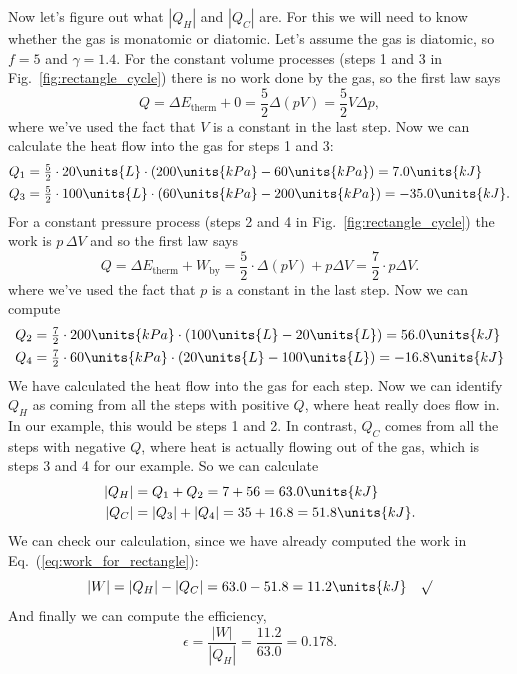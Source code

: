 Now let's figure out what $|Q_H|$ and $|Q_C|$ are.  For this we will
need to know whether the gas is monatomic or diatomic.  Let's assume
the gas is diatomic, so $f=5$ and $\gamma=1.4$.  For the constant
volume processes (steps 1 and 3 in Fig.~\ref{fig:rectangle_cycle})
there is no work done by the gas, so the first law says
\begin{equation}
 Q = \Delta E_\text{therm}+ 0 = {\textstyle\frac{5}{2}} \Delta(pV)
 = \textstyle{\frac{5}{2}} V\Delta p,
\end{equation}
where we've used the fact that $V$ is a constant in the last step.
Now we can calculate the heat flow into the gas for steps 1 and 3:
\begin{align}
Q_1 &= {\textstyle\frac{5}{2}}\cdot  20\units{L}\cdot (200\units{kPa}-60\units{kPa}) =
7.0\units{kJ}\nonumber\\
Q_3 &= {\textstyle\frac{5}{2}}\cdot  100\units{L} \cdot (60\units{kPa}-200\units{kPa}) =
-35.0\units{kJ}.
\end{align}
For a constant pressure process (steps 2 and 4 in
Fig.~\ref{fig:rectangle_cycle}) the work is $p\, \Delta V$ and so the
first law says
\begin{equation}
Q = \Delta E_\text{therm}+ W_\text{by} = {\textstyle\frac{5}{2}}\cdot \Delta(pV) +
p\Delta V = {\textstyle\frac{7}{2}}\cdot  p\Delta V.
\end{equation}
where we've used the fact that $p$ is a constant in the last step.
Now we can compute
\begin{align}
Q_2 &= {\textstyle\frac{7}{2}}\cdot  200\units{kPa}\cdot (100\units{L} - 20\units{L})
 = 56.0\units{kJ} \nonumber\\
Q_4 &= {\textstyle\frac{7}{2}}\cdot 60\units{kPa}\cdot (20\units{L} - 100\units{L})
 = -16.8\units{kJ} 
\end{align}
We have calculated the heat flow into the gas for each step.  Now we
can identify $Q_H$ as coming from all the steps with positive $Q$,
where heat really does flow in.  In our example, this would be steps 1
and 2.  In contrast, $Q_C$ comes from all the steps with negative $Q$,
where heat is actually flowing out of the gas, which is steps 3 and 4
for our example.  So we can calculate
\begin{align}
|Q_H| &= Q_1 + Q_2 = 7 + 56 = 63.0\units{kJ} \nonumber\\
|Q_C| &= |Q_3| + |Q_4| = 35 + 16.8 = 51.8\units{kJ}.
\end{align}
We can check our calculation, since we have already computed the work
in Eq.~(\ref{eq:work_for_rectangle}):
\begin{equation}
|W| = |Q_H|-|Q_C| = 63.0 - 51.8 = 11.2\units{kJ} \quad \surd
\end{equation}
And finally we can compute the efficiency,
\begin{equation}
\epsilon = \frac{|W|}{|Q_H|} = \frac{11.2}{63.0} = 0.178.
\end{equation}

